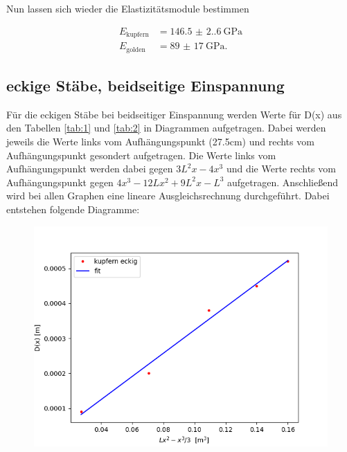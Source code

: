 \noindent Nun lassen sich wieder die Elastizitätsmodule bestimmen

\begin{align*}
    E_\text{kupfern} &= \SI[separate-uncertainty=true]{146.5(2.6)}{\giga\pascal} \\
    E_\text{golden} &=  \SI[separate-uncertainty=true]{89(17)}{\giga\pascal}.
\end{align*}

\subsection{eckige Stäbe, beidseitige Einspannung}

Für die eckigen Stäbe bei beidseitiger Einspannung werden Werte für D(x) aus den Tabellen \ref{tab:1} und \ref{tab:2} in Diagrammen aufgetragen. Dabei werden jeweils die Werte links vom Aufhängungspunkt (27.5cm) und rechts vom Aufhängungspunkt gesondert aufgetragen. Die Werte links vom Aufhängungspunkt werden dabei gegen $3L^2x-4x^3$ und die Werte rechts vom Aufhängungspunkt gegen $4x^3-12Lx^2+9L^2x-L^3$ aufgetragen. Anschließend wird bei allen Graphen eine lineare Ausgleichsrechnung durchgeführt. Dabei entstehen folgende Diagramme:

\begin{figure}[H]
    \centering
    \includegraphics{keb.png}
\end{figure}

